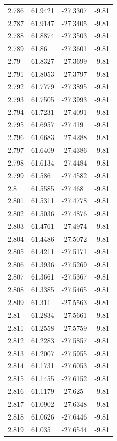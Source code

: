 \begin{tabular}{llll}
2.786 & 61.9421 & -27.3307 & -9.81 \\
2.787 & 61.9147 & -27.3405 & -9.81 \\
2.788 & 61.8874 & -27.3503 & -9.81 \\
2.789 & 61.86 & -27.3601 & -9.81 \\
2.79 & 61.8327 & -27.3699 & -9.81 \\
2.791 & 61.8053 & -27.3797 & -9.81 \\
2.792 & 61.7779 & -27.3895 & -9.81 \\
2.793 & 61.7505 & -27.3993 & -9.81 \\
2.794 & 61.7231 & -27.4091 & -9.81 \\
2.795 & 61.6957 & -27.419 & -9.81 \\
2.796 & 61.6683 & -27.4288 & -9.81 \\
2.797 & 61.6409 & -27.4386 & -9.81 \\
2.798 & 61.6134 & -27.4484 & -9.81 \\
2.799 & 61.586 & -27.4582 & -9.81 \\
2.8 & 61.5585 & -27.468 & -9.81 \\
2.801 & 61.5311 & -27.4778 & -9.81 \\
2.802 & 61.5036 & -27.4876 & -9.81 \\
2.803 & 61.4761 & -27.4974 & -9.81 \\
2.804 & 61.4486 & -27.5072 & -9.81 \\
2.805 & 61.4211 & -27.5171 & -9.81 \\
2.806 & 61.3936 & -27.5269 & -9.81 \\
2.807 & 61.3661 & -27.5367 & -9.81 \\
2.808 & 61.3385 & -27.5465 & -9.81 \\
2.809 & 61.311 & -27.5563 & -9.81 \\
2.81 & 61.2834 & -27.5661 & -9.81 \\
2.811 & 61.2558 & -27.5759 & -9.81 \\
2.812 & 61.2283 & -27.5857 & -9.81 \\
2.813 & 61.2007 & -27.5955 & -9.81 \\
2.814 & 61.1731 & -27.6053 & -9.81 \\
2.815 & 61.1455 & -27.6152 & -9.81 \\
2.816 & 61.1179 & -27.625 & -9.81 \\
2.817 & 61.0902 & -27.6348 & -9.81 \\
2.818 & 61.0626 & -27.6446 & -9.81 \\
2.819 & 61.035 & -27.6544 & -9.81 \\

\end{tabular}
